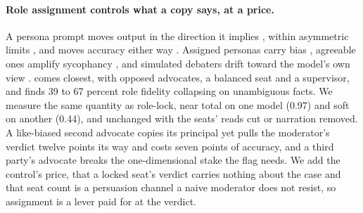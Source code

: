 \paragraph{Role assignment controls what a copy says, at a price.}
A persona prompt moves output in the direction it implies
\citep{shanahan2023roleplay,salewski2023impersonation,li2023camel}, within
asymmetric limits
\citep{miehling2025steerability,liu2024persona,santurkar2023opinions}, and
moves accuracy either way
\citep{zheng2024helpful,kim2025persona,kong2024roleplay}. Assigned personas
carry bias \citep{gupta2024bias,deshpande2023toxicity,dash2026motivated},
agreeable ones amplify sycophancy \citep{shah2026toonice}, and simulated
debaters drift toward the model's own view \citep{taubenfeld2024systematic}.
\citet{dietrich2026roles} comes closest, with opposed advocates, a balanced
seat and a supervisor, and finds 39 to 67 percent role fidelity collapsing on
unambiguous facts. We measure the same quantity as role-lock, near total on
one model (0.97) and soft on another (0.44), and unchanged with the seats'
reads cut or narration removed. A like-biased second advocate copies its
principal yet pulls the moderator's verdict twelve points its way and costs
seven points of accuracy, and a third party's advocate breaks the
one-dimensional stake the flag needs. We add the control's price, that a
locked seat's verdict carries nothing about the case and that seat count is a
persuasion channel a naive moderator does not resist, so assignment is a lever
paid for at the verdict.

